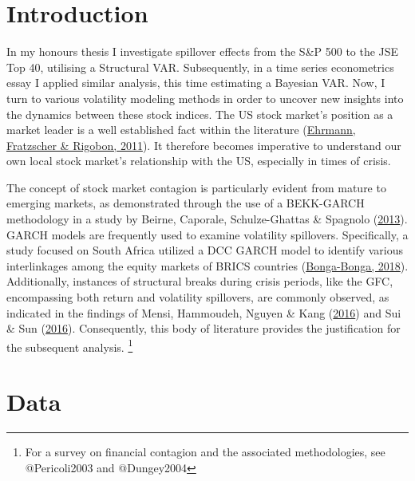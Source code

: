 \documentclass[11pt,preprint, authoryear]{elsarticle}
\numberwithin{equation}{section}
\numberwithin{figure}{section}
\numberwithin{table}{section}
\let\rmarkdownfootnote\footnote%
\def\footnote{\protect\rmarkdownfootnote}
\begin{document}

\headsep 35pt %




\hypertarget{introduction}{%
\section{\texorpdfstring{Introduction
\label{Introduction}}{Introduction }}\label{introduction}}

In my honours thesis I investigate spillover effects from the S\&P 500
to the JSE Top 40, utilising a Structural VAR. Subsequently, in a time
series econometrics essay I applied similar analysis, this time
estimating a Bayesian VAR. Now, I turn to various volatility modeling
methods in order to uncover new insights into the dynamics between these
stock indices. The US stock market's position as a market leader is a
well established fact within the literature
(\protect\hyperlink{ref-Ehrmann2011}{Ehrmann, Fratzscher \& Rigobon,
2011}). It therefore becomes imperative to understand our own local
stock market's relationship with the US, especially in times of crisis.

The concept of stock market contagion is particularly evident from
mature to emerging markets, as demonstrated through the use of a
BEKK-GARCH methodology in a study by Beirne, Caporale, Schulze-Ghattas
\& Spagnolo (\protect\hyperlink{ref-Beirne2013}{2013}). GARCH models are
frequently used to examine volatility spillovers. Specifically, a study
focused on South Africa utilized a DCC GARCH model to identify various
interlinkages among the equity markets of BRICS countries
(\protect\hyperlink{ref-BONGABONGA2018}{Bonga-Bonga, 2018}).
Additionally, instances of structural breaks during crisis periods, like
the GFC, encompassing both return and volatility spillovers, are
commonly observed, as indicated in the findings of Mensi, Hammoudeh,
Nguyen \& Kang (\protect\hyperlink{ref-Mensi2016}{2016}) and Sui \& Sun
(\protect\hyperlink{ref-SuiSun2016}{2016}). Consequently, this body of
literature provides the justification for the subsequent analysis.
\footnote{For a survey on financial contagion and the associated methodologies,  see @Pericoli2003 and @Dungey2004}

\hypertarget{data}{%
\section{Data}\label{data}}
\end{document}
